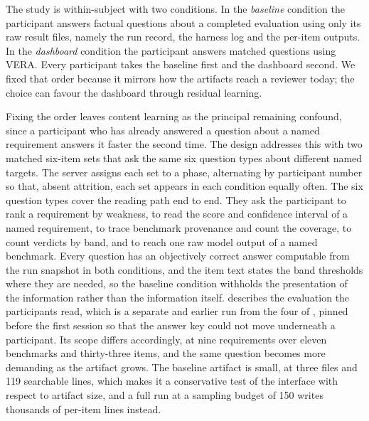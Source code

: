 \documentclass[10pt,conference]{IEEEtran}
\begin{document}
The study is within-subject with two conditions.
In the \emph{baseline} condition the participant answers factual questions about a completed evaluation using only its raw result files, namely the run record, the harness log and the per-item outputs.
In the \emph{dashboard} condition the participant answers matched questions using VERA.
Every participant takes the baseline first and the dashboard second.
We fixed that order because it mirrors how the artifacts reach a reviewer today; the choice can favour the dashboard through residual learning.

Fixing the order leaves content learning as the principal remaining confound, since a participant who has already answered a question about a named requirement answers it faster the second time.
The design addresses this with two matched six-item sets that ask the same six question types about different named targets.
The server assigns each set to a phase, alternating by participant number so that, absent attrition, each set appears in each condition equally often.
The six question types cover the reading path end to end.
They ask the participant to rank a requirement by weakness, to read the score and confidence interval of a named requirement, to trace benchmark provenance and count the coverage, to count verdicts by band, and to reach one raw model output of a named benchmark.
Every question has an objectively correct answer computable from the run snapshot in both conditions, and the item text states the band thresholds where they are needed, so the baseline condition withholds the presentation of the information rather than the information itself.
 describes the evaluation the participants read, which is a separate and earlier run from the four of , pinned before the first session so that the answer key could not move underneath a participant.
Its scope differs accordingly, at nine requirements over eleven benchmarks and thirty-three items, and the same question becomes more demanding as the artifact grows.
The baseline artifact is small, at three files and 119 searchable lines, which makes it a conservative test of the interface with respect to artifact size, and a full run at a sampling budget of 150 writes thousands of per-item lines instead.
\end{document}
